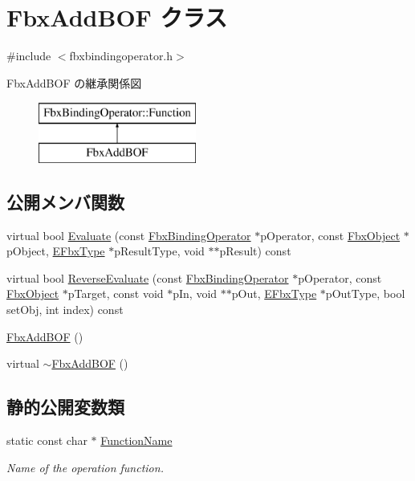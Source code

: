 \hypertarget{class_fbx_add_b_o_f}{}\section{Fbx\+Add\+B\+OF クラス}
\label{class_fbx_add_b_o_f}


{\ttfamily \#include $<$fbxbindingoperator.\+h$>$}

Fbx\+Add\+B\+OF の継承関係図\begin{figure}[H]
\begin{center}
\leavevmode
\includegraphics[height=2.000000cm]{class_fbx_add_b_o_f}
\end{center}
\end{figure}
\subsection*{公開メンバ関数}
\begin{DoxyCompactItemize}
\item 
virtual bool \hyperlink{class_fbx_add_b_o_f_a2b1552f30e4ce028d9b67247ed3b9d06}{Evaluate} (const \hyperlink{class_fbx_binding_operator}{Fbx\+Binding\+Operator} $\ast$p\+Operator, const \hyperlink{class_fbx_object}{Fbx\+Object} $\ast$p\+Object, \hyperlink{fbxpropertytypes_8h_a73913a5ddfb20e57c6f25e9e6784bd92}{E\+Fbx\+Type} $\ast$p\+Result\+Type, void $\ast$$\ast$p\+Result) const
\item 
virtual bool \hyperlink{class_fbx_add_b_o_f_aee96f76da5722af28d12b65eefcc61bb}{Reverse\+Evaluate} (const \hyperlink{class_fbx_binding_operator}{Fbx\+Binding\+Operator} $\ast$p\+Operator, const \hyperlink{class_fbx_object}{Fbx\+Object} $\ast$p\+Target, const void $\ast$p\+In, void $\ast$$\ast$p\+Out, \hyperlink{fbxpropertytypes_8h_a73913a5ddfb20e57c6f25e9e6784bd92}{E\+Fbx\+Type} $\ast$p\+Out\+Type, bool set\+Obj, int index) const
\item 
\hyperlink{class_fbx_add_b_o_f_ac0950ff84a9d2e228949b29a14376dee}{Fbx\+Add\+B\+OF} ()
\item 
virtual \hyperlink{class_fbx_add_b_o_f_a20fa9c0da07357b512939e5c6732b62f}{$\sim$\+Fbx\+Add\+B\+OF} ()
\end{DoxyCompactItemize}
\subsection*{静的公開変数類}
\begin{DoxyCompactItemize}
\item 
static const char $\ast$ \hyperlink{class_fbx_add_b_o_f_a2929c676c1a89849156895fbe579fd4e}{Function\+Name}
\begin{DoxyCompactList}\small\item\em Name of the operation function. \end{DoxyCompactList}\end{DoxyCompactItemize}


